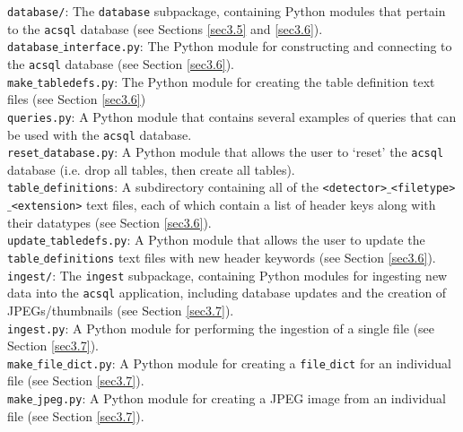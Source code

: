 \documentclass[10pt,journal,compsoc]{IEEEtran}
\begin{document}
\noindent\texttt{database/}: The \texttt{database} subpackage, containing Python modules that pertain to the \texttt{acsql} database (see Sections \ref{sec3.5} and \ref{sec3.6}).\\

\noindent\texttt{database$\_$interface.py}: The Python module for constructing and connecting to the \texttt{acsql} database (see Section \ref{sec3.6}). \\

\noindent\texttt{make$\_$tabledefs.py}: The Python module for creating the table definition text files (see Section \ref{sec3.6}) \\

\noindent\texttt{queries.py}: A Python module that contains several examples of queries that can be used with the \texttt{acsql} database.\\

\noindent\texttt{reset$\_$database.py}: A Python module that allows the user to `reset' the \texttt{acsql} database (i.e. drop all tables, then create all tables).\\

\noindent\texttt{table$\_$definitions}: A subdirectory containing all of the \texttt{<detector>$\_$<filetype>$\_$<extension>} text files, each of which contain a list of header keys along with
their datatypes (see Section \ref{sec3.6}).\\

\noindent\texttt{update$\_$tabledefs.py}: A Python module that allows the user to update the \texttt{table$\_$definitions} text files with new header keywords (see Section \ref{sec3.6}).\\

\noindent\texttt{ingest/}: The \texttt{ingest} subpackage, containing Python modules for ingesting new data into the \texttt{acsql} application, including database updates and the creation of
JPEGs/thumbnails (see Section \ref{sec3.7}).\\

\noindent\texttt{ingest.py}: A Python module for performing the ingestion of a single file (see Section \ref{sec3.7}).\\

\noindent\texttt{make$\_$file$\_$dict.py}: A Python module for creating a \texttt{file$\_$dict} for an individual file (see Section \ref{sec3.7}).\\

\noindent\texttt{make$\_$jpeg.py}: A Python module for creating a JPEG image from an individual file (see Section \ref{sec3.7}).\\
\end{document}
